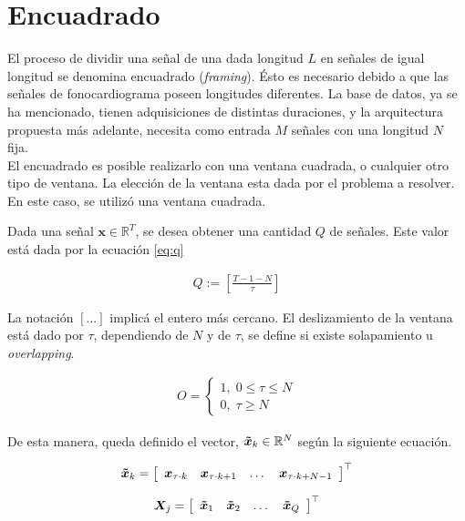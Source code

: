 \newpage

\section{Encuadrado}

\indent El proceso de dividir una señal de una dada longitud $L$ en señales de igual longitud se denomina encuadrado (\textit{framing}). Ésto es necesario debido a que las señales de fonocardiograma poseen longitudes diferentes. La base de datos, ya se ha mencionado, tienen adquisiciones de distintas duraciones, y la arquitectura propuesta más adelante, necesita como entrada $M$ señales con una longitud $N$ fija. \\
\indent El encuadrado es posible realizarlo con una ventana cuadrada, o cualquier otro tipo de ventana. La elección de la ventana esta dada por el problema a resolver. En este caso, se utilizó una ventana cuadrada. \bigskip

\indent Dada una señal $\mathbf{x} \in \mathbb{R}^T$, se desea obtener una cantidad $Q$ de señales. Este valor está dada por la ecuación \ref{eq:q}

\begin{align}
    \label{eq:q}
    Q := \left[\frac{T-1-N}{\tau}\right]
\end{align}

\indent La notación $[...]$ implicá el entero más cercano. El deslizamiento de la ventana está dado por $\tau$, dependiendo de $N$ y de $\tau$, se define si existe solapamiento u \textit{overlapping}.

\begin{align}
    O =
    \begin{cases}
    1, \; 0 \leq \tau \leq N \\
    0, \; \tau \geq N
    \end{cases}
\end{align}

\indent De esta manera, queda definido el vector, $\bm{\Tilde{x}}_k \in \mathbb{R}^{N}$ según la siguiente ecuación.

\begin{align}
    \bm{\Tilde{x}}_k = \left[\begin{array}{cccc}
         \bm{x}_{\tau \cdot k} &
         \bm{x}_{\tau \cdot k+1} &
         \dots & \bm{x}_{\tau \cdot k + N - 1}
    \end{array}\right]^\top
\end{align}

\begin{align}
    \bm{X}_j = \left[\begin{array}{cccc}
         \bm{\Tilde{x}}_1 &
         \bm{\Tilde{x}}_2 &
         \dots &
         \bm{\Tilde{x}}_Q
    \end{array}\right]^\top
\end{align}

